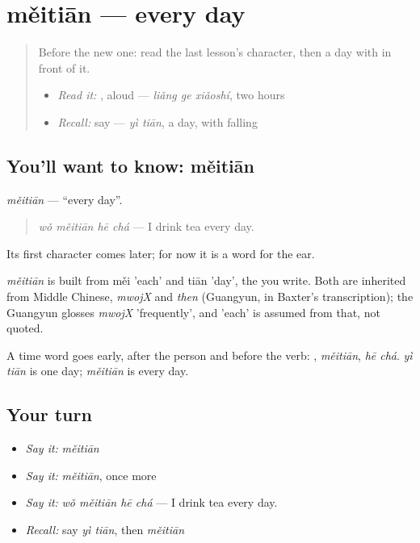 \section[měitiān]{měitiān — every day}

\label{lesson:ZH-C97-meitian}



\begin{quote}
Before the new one: read the last lesson's character, then a day with  in front of it.

\begin{itemize}
\raggedright
  \item \emph{Read it:} , aloud — \emph{liǎng ge xiǎoshí}, two hours
  \item \emph{Recall:} say  — \emph{yì tiān}, a day, with  falling
\end{itemize}
\end{quote}

\subsection*{You'll want to know: měitiān}
\emph{měitiān} — \textquotedblleft{}every day\textquotedblright{}.

\begin{quote}
\emph{wǒ měitiān hē chá} — I drink tea every day.
\end{quote}

Its first character comes later; for now it is a word for the ear.

\begin{cousinweb}
\emph{měitiān} is built from měi 'each' and tiān 'day', the  you write. Both are inherited from Middle Chinese, \emph{mwojX} and \emph{then} (Guangyun, in Baxter's transcription); the Guangyun glosses \emph{mwojX} 'frequently', and 'each' is assumed from that, not quoted.
\end{cousinweb}

\begin{grammarlens}[title={What you've built}]
A time word goes early, after the person and before the verb: , \emph{měitiān}, \emph{hē chá}. \emph{yì tiān} is one day; \emph{měitiān} is every day.
\end{grammarlens}

\subsection*{Your turn}
\begin{itemize}
\raggedright
  \item \emph{Say it:} \emph{měitiān}
  \item \emph{Say it:} \emph{měitiān}, once more
  \item \emph{Say it:} \emph{wǒ měitiān hē chá} — I drink tea every day.
  \item \emph{Recall:} say \emph{yì tiān}, then \emph{měitiān}
\end{itemize}

